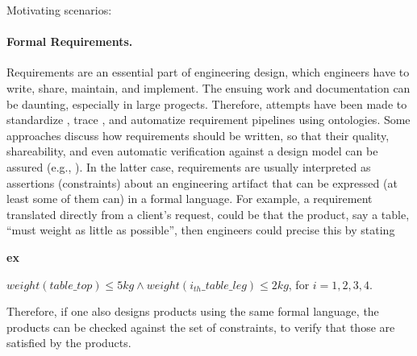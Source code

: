 \documentclass[sw]{iosart2x}
\newcommand{\bflist}{\begin{list}{}{\setlength{\topsep}{2mm}\setlength{\partopsep}{0mm}\setlength{\parsep}{0mm}\setlength{\leftmargin}{9mm}\setlength{\labelwidth}{8mm}}}
\newcommand{\eflist}{\end{list}}
\newcommand{\ExLabel}{\textrm{ex}}
\newcommand{\myex}[1]{\refstepcounter{cntex}\begin{small}{\bf \ExLabel\thecntex\label{ex:#1}}\end{small}}
\newcounter{cntex}
\newcommand{\qquotes}[1]{``#1''}
\newcommand{\TODO}[1]{{\color{red} #1
}}
\begin{document}
Motivating scenarios:
\paragraph{Formal Requirements.}
Requirements are an essential part of engineering design, which engineers have to write, share, maintain, and implement. 
The ensuing work and documentation can be daunting, especially in large progects. Therefore, attempts have been made to standardize \cite{alrumaihDomainOntologyRequirements2020}, trace \cite{murtazinaOntologybasedApproachSupport2019}, and automatize \cite{holterScopeDetectionTextual2021} requirement pipelines using ontologies. 
Some approaches discuss how requirements should be written, so that their quality, shareability, and even automatic verification against a design model can be assured (e.g., \cite{jinxinlinRequirementOntologyEngineering1996, chenOntologybasedRequirementVerification2020}).
In the latter case, requirements are usually interpreted as assertions (constraints) about an engineering artifact that can be expressed (at least some of them can) in a formal language. 
For example, a requirement translated directly from a client's request, could be that the product, say a table, \qquotes{must weight as little as possible}, then engineers could precise this by stating 
\bflist
  \item[\myex{req1}] $ weight(table\_top) \leq 5kg \land weight(i_{th}\_table\_leg) \leq 2kg$, for $i = 1,2,3,4$. 
\eflist
Therefore, if one also designs products using the same formal language, the products can be checked against the set of constraints, to verify that those are satisfied by the products.
\end{document}

